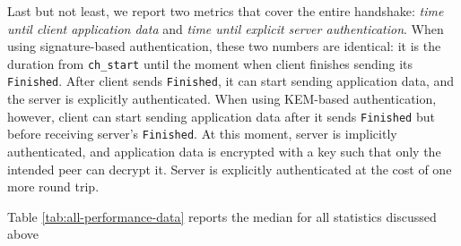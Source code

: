 \documentclass[letterpaper,12pt,titlepage,oneside,final]{book}
\begin{document}
Last but not least, we report two metrics that cover the entire handshake: \emph{time until client application data} and \emph{time until explicit server authentication}.
When using signature-based authentication, these two numbers are identical: it is the duration from \texttt{ch\_start} until the moment when client finishes sending its \texttt{Finished}.
After client sends \texttt{Finished}, it can start sending application data, and the server is explicitly authenticated.
When using KEM-based authentication, however, client can start sending application data after it sends \texttt{Finished} but before receiving server's \texttt{Finished}.
At this moment, server is implicitly authenticated, and application data is encrypted with a key such that only the intended peer can decrypt it.
Server is explicitly authenticated at the cost of one more round trip.

Table \ref{tab:all-performance-data} reports the median for all statistics discussed above
\end{document}
